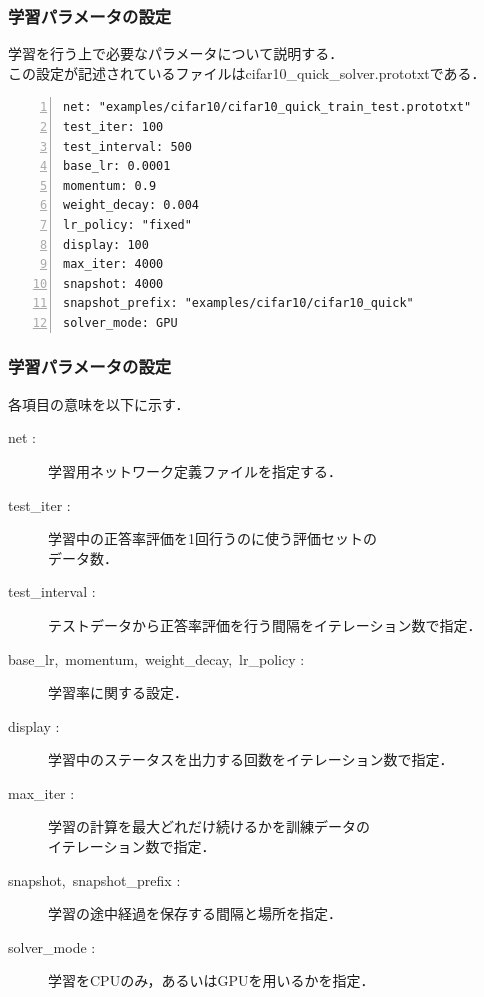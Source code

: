 \documentclass[dvipdfmx,11pt,notheorems]{beamer}
\theoremstyle{definition}
\begin{document}


\begin{frame}[fragile]\frametitle{学習パラメータの設定}
学習を行う上で必要なパラメータについて説明する．\\この設定が記述されているファイルはcifar10\_quick\_solver.prototxtである．

\begin{lstlisting}[basicstyle=\ttfamily\footnotesize, frame=single, firstnumber=1, numbers=left, breaklines=true]
net: "examples/cifar10/cifar10_quick_train_test.prototxt"
test_iter: 100
test_interval: 500
base_lr: 0.0001
momentum: 0.9
weight_decay: 0.004
lr_policy: "fixed"
display: 100
max_iter: 4000
snapshot: 4000
snapshot_prefix: "examples/cifar10/cifar10_quick"
solver_mode: GPU
\end{lstlisting}

\end{frame}

\begin{frame}[fragile]\frametitle{学習パラメータの設定}
各項目の意味を以下に示す．
\begin{description}
  \item[net :]学習用ネットワーク定義ファイルを指定する．
  \item[test\_iter :]学習中の正答率評価を1回行うのに使う評価セットの\\データ数．
  \item[test\_interval :]テストデータから正答率評価を行う間隔をイテレーション数で指定．
  \item[base\_lr,\ momentum,\ weight\_decay,\ lr\_policy :]学習率に関する設定．
  \item[display :]学習中のステータスを出力する回数をイテレーション数で指定．
  \item[max\_iter :]学習の計算を最大どれだけ続けるかを訓練データの\\イテレーション数で指定．
  \item[snapshot,\ snapshot\_prefix :]学習の途中経過を保存する間隔と場所を指定．
  \item[solver\_mode :]学習をCPUのみ，あるいはGPUを用いるかを指定．
\end{description}
\end{frame}
\end{document}
